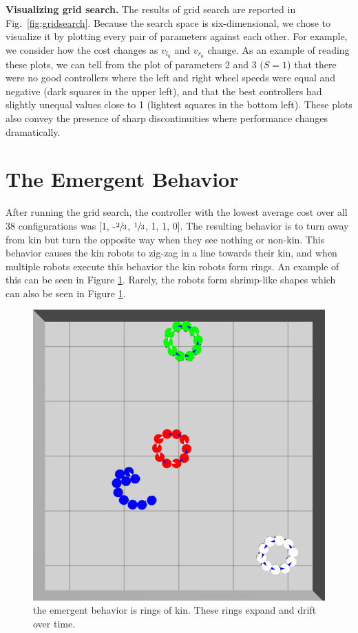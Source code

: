 \documentclass[conference]{IEEEtran}
\newcommand{\myparagraph}[1]{\textbf{#1.}}
\begin{document}
\myparagraph{Visualizing grid search}
The results of grid search are reported in Fig.~\ref{fig:gridsearch}. Because
the search space is six-dimensional, we chose to visualize it by plotting every
pair of parameters against each other. For example, we consider how the cost
changes as $v_{l_0}$ and $v_{r_0}$ change. As an example of reading these plots,
we can tell from the plot of parameters 2 and 3 ($S=1$) that there were no good
controllers where the left and right wheel speeds were equal and negative (dark
squares in the upper left), and that the best controllers had slightly unequal
values close to 1 (lightest squares in the bottom left). These plots also convey
the presence of sharp discontinuities where performance changes dramatically.

\section{The Emergent Behavior}

After running the grid search, the controller with the lowest average cost over
all 38 configurations was [1, -$\sfrac{2}{3}$, $\sfrac{1}{3}$, 1, 1, 0]. The
resulting behavior is to turn away from kin but turn the opposite way when they
see nothing or non-kin. This behavior causes the kin robots to zig-zag in a line
towards their kin, and when multiple robots execute this behavior the kin robots
form rings. An example of this can be seen in Figure \ref{fig:rings}. Rarely,
the robots form shrimp-like shapes which can also be seen in Figure
\ref{fig:rings}.

\begin{figure}
  \centering
  \includegraphics[width=0.5\linewidth]{./images/rings_example.png}
  \caption{the emergent behavior is rings of kin. These rings expand and drift over time.}
  \label{fig:rings}
\end{figure}
\end{document}
